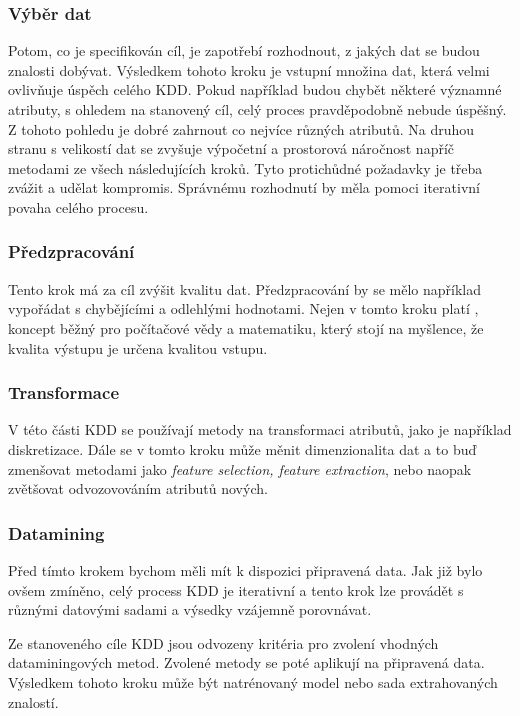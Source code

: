 \documentclass[thesis=M,czech]{FITthesis}[2012/06/26]
\begin{document}
\subsubsection*{Výběr dat}
Potom, co je specifikován cíl, je zapotřebí rozhodnout, z jakých dat se budou znalosti dobývat. 
Výsledkem tohoto kroku je vstupní množina dat, která velmi ovlivňuje úspěch celého KDD. Pokud například budou chybět některé významné atributy, s ohledem na stanovený cíl, celý proces pravděpodobně nebude úspěšný. Z tohoto pohledu je dobré zahrnout co nejvíce různých atributů. Na druhou stranu s velikostí dat se zvyšuje výpočetní a prostorová náročnost napříč metodami ze všech následujících kroků. Tyto protichůdné požadavky je třeba zvážit a udělat kompromis. Správnému rozhodnutí by měla pomoci iterativní povaha celého procesu.

\subsubsection*{Předzpracování}
Tento krok má za cíl zvýšit kvalitu dat. Předzpracování by se mělo například vypořádat s chybějícími a odlehlými hodnotami. Nejen v tomto kroku platí , koncept běžný pro počítačové vědy a matematiku, který stojí na myšlence, že kvalita výstupu je určena kvalitou vstupu\cite{g_in_g_out}.

\subsubsection*{Transformace }
\label{subsec:transformace}

V této části KDD se používají metody na transformaci atributů, jako je například diskretizace. Dále se v tomto kroku může měnit dimenzionalita dat a to buď zmenšovat metodami jako \textit{feature selection, feature extraction}, nebo naopak zvětšovat odvozovováním atributů nových. 


\subsubsection*{Datamining}
Před tímto krokem bychom měli mít k dispozici připravená data. Jak již bylo ovšem zmíněno, celý process KDD je iterativní a tento krok lze provádět s různými datovými sadami a výsedky vzájemně porovnávat.

Ze stanoveného cíle KDD jsou odvozeny kritéria pro zvolení vhodných dataminingových metod. Zvolené metody se poté aplikují na připravená data. Výsledkem tohoto kroku může být natrénovaný model nebo sada extrahovaných znalostí.
\end{document}

